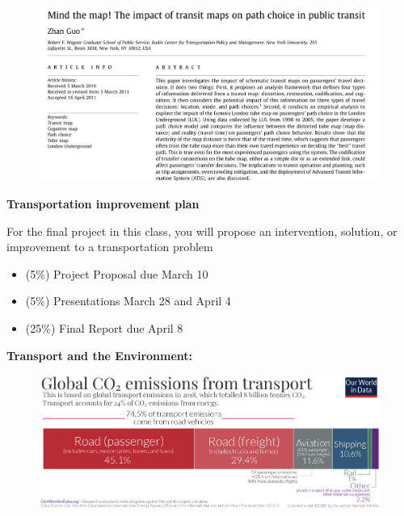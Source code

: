 \documentclass[aspectratio=169]{beamer}
\begin{document}
\begin{frame}
	
	\begin{figure}
		\centering
		\includegraphics[width=0.88\linewidth]{images/mind-the-map.png}
	\end{figure}
	
\end{frame}







\begin{frame}
	
	\textbf{Transportation improvement plan}
	
	\vspace{2mm}
	
	For the final project in this class, you will propose an intervention, solution, or improvement to a transportation problem
	
	\vspace{2mm}
	
	\begin{itemize}
		\item (5\%) Project Proposal due March 10
		\item (5\%) Presentations March 28 and April 4
		\item (25\%) Final Report due April 8
	\end{itemize}
	
\end{frame}





\begin{frame}
	
	\textbf{Transport and the Environment:}

		\begin{figure}
			\centering
			\includegraphics[width=0.98\linewidth]{images/Transport-CO2-emissions-by-mode-bar-chart.png}
		\end{figure}
	
\end{frame}
\end{document}
